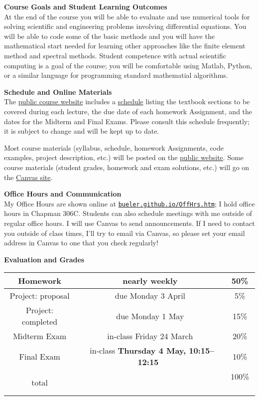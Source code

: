 \documentclass[12pt]{article}
\renewcommand{\emph}[1]{\textsf{\textbf{#1}}}
\newcommand{\localhead}[1]{\par\smallskip\textbf{#1} \smallskip\nobreak\\}%
\def\heading#1{\localhead{\large\emph{#1}}}
\begin{document}
\heading{Course Goals and Student Learning Outcomes}
At the end of the course you will be able to evaluate and use numerical tools for solving scientific and engineering problems involving differential equations.  You will be able to code some of the basic methods and you will have the mathematical start needed for learning other approaches like the finite element method and spectral methods.  Student competence with actual scientific computing is a goal of the course; you will be comfortable using Matlab, Python, or a similar language for programming standard mathematial algorithms.


\heading{Schedule and Online Materials}
The \href{https://bueler.github.io/nade/}{public course website} includes a \href{https://bueler.github.io/nade/assets/general/S23/schedule.pdf}{schedule} listing the textbook sections to be covered during each lecture, the due date of each homework Assignment, and the dates for the Midterm and Final Exams.  Please consult this schedule frequently; it is subject to change and will be kept up to date.

Most course materials (syllabus, schedule, homework Assignments, code examples, project description, etc.) will be posted on the \href{https://bueler.github.io/nade/}{public website}.  Some course materials (student grades, homework and exam solutions, etc.) will go on the \href{https://canvas.alaska.edu/courses/13208}{Canvas site}.


\heading{Office Hours and Communication}
My Office Hours are shown online at \href{http://bueler.github.io/OffHrs.htm}{\texttt{bueler.github.io/OffHrs.htm}}; I hold office hours in Chapman 306C.  Students can also schedule meetings with me outside of regular office hours.  I will use Canvas to send announcements.  If I need to contact you outside of class times, I'll try to email via Canvas, so please set your email address in Canvas to one that you check regularly!

\medskip
\heading{Evaluation and Grades}
\vskip -10pt

\begin{tabular}{|c|c|c|}
\hline
Homework & nearly weekly & 50\% \\
\hline
Project: proposal & due Monday 3 April & 5\%  \\
\hline
Project: completed & due Monday 1 May & 15\%  \\
\hline
Midterm Exam & in-class Friday 24 March & 20\%  \\
\hline
Final Exam & \, in-class \emph{Thursday 4 May, 10:15--12:15} \, & 10\% \\
\hline
total & & 100\% \, \\
\hline
\end{tabular}
\end{document}
